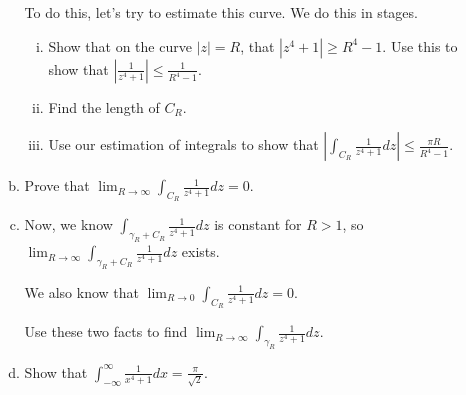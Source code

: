 \begin{enumerate}
\begin{enumerate}[a)]
To do this, let's try to estimate this curve. We do this in stages.

\begin{enumerate}[i)]
\item Show that on the curve $|z| = R$, that ${|z^4 + 1|}\ge R^4 - 1$. Use this to show that $\left| \frac{1}{z^4 + 1}\right| \le \frac{1}{R^4 - 1}$.
\item Find the length of $C_R$.
\item Use our estimation of integrals to show that $|\int_{C_R} \frac{1}{z^4 + 1}dz| \le \frac{\pi R}{R^4 - 1}$.
\end{enumerate}

\item Prove that $\lim_{R\rightarrow \infty} \int_{C_R} \frac{1}{z^4 + 1}dz  = 0$.

\item Now, we know $\int_{\gamma_R + C_R} \frac{1}{z^4 + 1}dz$ is constant for $R > 1$, so $\lim_{R\rightarrow \infty} \int_{\gamma_R + C_R} \frac{1}{z^4 + 1}dz$ exists.

\vspace{10pt}

We also know that $\lim_{R\rightarrow 0} \int_{C_R}\frac{1}{z^4 + 1} dz = 0$.

\vspace{10pt}

Use these two facts to find $\lim_{R\rightarrow \infty} \int_{\gamma_R} \frac{1}{z^4 + 1}dz$.

\item Show that $\int_{-\infty}^\infty \frac{1}{x^4 + 1}dx = \frac{\pi}{\sqrt{2}}$.

\end{enumerate}
\end{enumerate}

